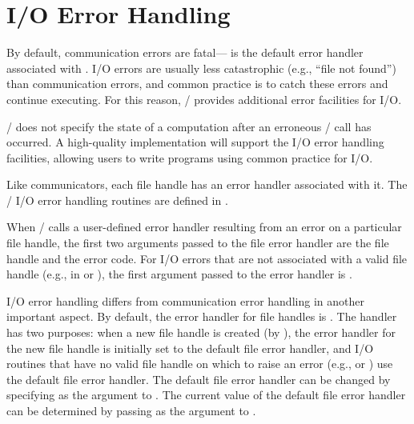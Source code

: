 \section{I/O Error Handling}
\label{sec:io-errhandlers}

By default, communication errors are fatal---
is the default error handler associated with .
I/O errors are usually less catastrophic (e.g., ``file not found'')
than communication errors,
and common practice is to catch these errors and continue executing.
For this reason, \MPI/ provides additional error facilities for I/O.

\begin{users}
\MPI/ does not specify the state of a computation after an erroneous
\MPI/ call has occurred.  A high-quality implementation will support
the I/O error handling facilities, allowing users to write programs using
common practice for I/O.
\end{users}

Like communicators, each file handle has an error handler associated with it.
The \MPI/ I/O error handling routines are defined in
.

When \MPI/ calls a user-defined error handler
resulting from an error on a particular file handle,
the first 
two arguments passed to the file error handler are the
file handle and the error code.
For I/O errors that are not associated with a valid file handle
(e.g., in  or ),
the first argument passed to the error handler is .

I/O error handling differs from communication error handling in 
another
important aspect.
By default, the error handler for file handles is
.
The  handler has two purposes:
when a new file handle is created (by ),
the error handler for the new file handle
is initially set to the default file error handler,
and I/O routines that have no valid file handle on which to raise an
error (e.g.,  or )
use the default file error handler.
The default file error handler can be changed by specifying
 as the  argument \linebreak
to .
The current value of the default file error handler can
be determined by passing  as the  argument
to .

